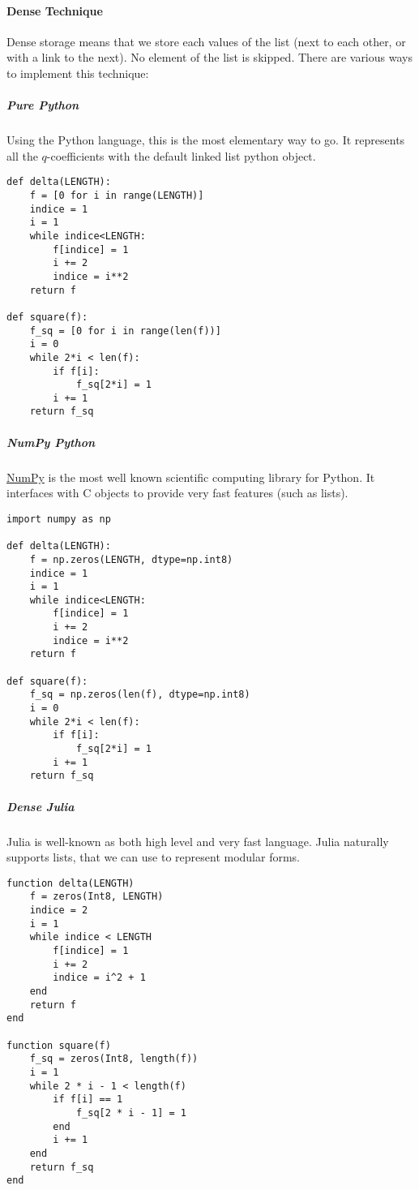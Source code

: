 \paragraph{Dense Technique}
Dense storage means that we store each values of the list (next to each other, or with a link to the next).
No element of the list is skipped.
There are various ways to implement this technique:
\subparagraph{Pure Python}
Using the Python language, this is the most elementary way to go.
It represents all the $q$-coefficients with the default linked list python object.
\begin{verbatim}
def delta(LENGTH):
	f = [0 for i in range(LENGTH)]
	indice = 1
	i = 1
	while indice<LENGTH:
		f[indice] = 1
		i += 2
		indice = i**2
	return f

def square(f):
	f_sq = [0 for i in range(len(f))]
	i = 0
	while 2*i < len(f):
		if f[i]:
			f_sq[2*i] = 1
		i += 1
	return f_sq
\end{verbatim}
\subparagraph{NumPy Python}
\href{https://fr.wikipedia.org/wiki/NumPy}{NumPy} is the most well known scientific computing library for Python.
It interfaces with C objects to provide very fast features (such as lists).
\begin{verbatim}
import numpy as np

def delta(LENGTH):
	f = np.zeros(LENGTH, dtype=np.int8)
	indice = 1
	i = 1
	while indice<LENGTH:
		f[indice] = 1
		i += 2
		indice = i**2
	return f

def square(f):
	f_sq = np.zeros(len(f), dtype=np.int8)
	i = 0
	while 2*i < len(f):
		if f[i]:
			f_sq[2*i] = 1
		i += 1
	return f_sq
\end{verbatim}
\subparagraph{Dense Julia}
Julia is well-known as both high level and very fast language.
Julia naturally supports lists, that we can use to represent modular forms.
\begin{verbatim}
function delta(LENGTH)
	f = zeros(Int8, LENGTH)
	indice = 2
	i = 1
	while indice < LENGTH
		f[indice] = 1
		i += 2
		indice = i^2 + 1
	end
	return f
end

function square(f)
	f_sq = zeros(Int8, length(f))
	i = 1
	while 2 * i - 1 < length(f)
		if f[i] == 1
			f_sq[2 * i - 1] = 1
		end
		i += 1
	end
	return f_sq
end
\end{verbatim}


